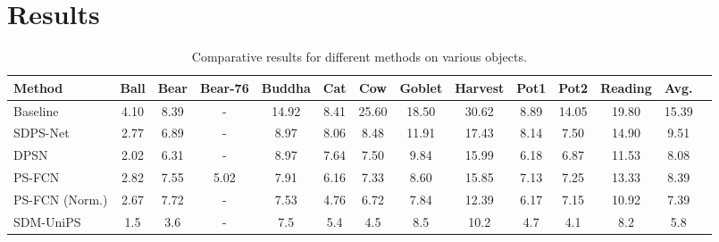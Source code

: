 \section{Results}

\begin{table}[h]
\centering
\small %
\begin{adjustbox}{max width=\textwidth}
\begin{tabular}{|l|c|c|c|c|c|c|c|c|c|c|c|c|c|}
\hline
Method & Ball & Bear & Bear-76 & Buddha & Cat & Cow & Goblet & Harvest & Pot1 & Pot2 & Reading & Avg. \\
\hline
Baseline  & 4.10 & 8.39 & - & 14.92 & 8.41 & 25.60 & 18.50 & 30.62 & 8.89 & 14.05 & 19.80 & 15.39 \\
SDPS-Net & 2.77 & 6.89 & - & 8.97 & 8.06 & 8.48 & 11.91 & 17.43 & 8.14 & 7.50 & 14.90 & 9.51 \\
DPSN  & 2.02 & 6.31 & - & 8.97 & 7.64 & 7.50 & 9.84 & 15.99 & 6.18 & 6.87 & 11.53 & 8.08 \\
PS-FCN & 2.82 & 7.55 & 5.02 & 7.91 & 6.16 & 7.33 & 8.60 & 15.85 & 7.13 & 7.25 & 13.33 & 8.39 \\
PS-FCN (Norm.) & 2.67 & 7.72 & - & 7.53 & 4.76 & 6.72 & 7.84 & 12.39 & 6.17 & 7.15 & 10.92 & 7.39 \\

SDM-UniPS & 1.5 & 3.6 & - & 7.5 & 5.4 & 4.5 & 8.5 & 10.2 & 4.7 & 4.1 & 8.2 & 5.8 \\
\hline
\end{tabular}
\end{adjustbox}

\caption{Comparative results for different methods on various objects.}
\end{table}

